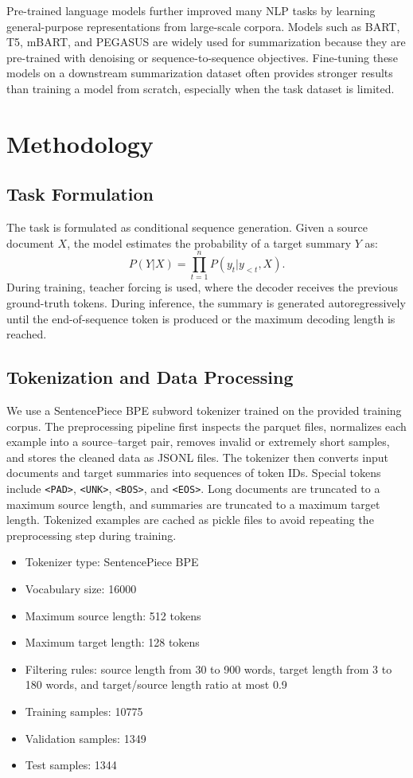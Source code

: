 \documentclass[conference]{IEEEtran}
\begin{document}
Pre-trained language models further improved many NLP tasks by learning general-purpose representations from large-scale corpora. Models such as BART, T5, mBART, and PEGASUS are widely used for summarization because they are pre-trained with denoising or sequence-to-sequence objectives. Fine-tuning these models on a downstream summarization dataset often provides stronger results than training a model from scratch, especially when the task dataset is limited.

\section{Methodology}

\subsection{Task Formulation}
The task is formulated as conditional sequence generation. Given a source document $X$, the model estimates the probability of a target summary $Y$ as:
\begin{equation}
P(Y|X) = \prod_{t=1}^{n} P(y_t | y_{<t}, X).
\end{equation}
During training, teacher forcing is used, where the decoder receives the previous ground-truth tokens. During inference, the summary is generated autoregressively until the end-of-sequence token is produced or the maximum decoding length is reached.

\subsection{Tokenization and Data Processing}
We use a SentencePiece BPE subword tokenizer trained on the provided training corpus. The preprocessing pipeline first inspects the parquet files, normalizes each example into a source--target pair, removes invalid or extremely short samples, and stores the cleaned data as JSONL files. The tokenizer then converts input documents and target summaries into sequences of token IDs. Special tokens include \texttt{<PAD>}, \texttt{<UNK>}, \texttt{<BOS>}, and \texttt{<EOS>}. Long documents are truncated to a maximum source length, and summaries are truncated to a maximum target length. Tokenized examples are cached as pickle files to avoid repeating the preprocessing step during training.

\begin{itemize}
    \item Tokenizer type: SentencePiece BPE
    \item Vocabulary size: 16000
    \item Maximum source length: 512 tokens
    \item Maximum target length: 128 tokens
    \item Filtering rules: source length from 30 to 900 words, target length from 3 to 180 words, and target/source length ratio at most 0.9
    \item Training samples: 10775
    \item Validation samples: 1349
    \item Test samples: 1344
\end{itemize}
\end{document}
